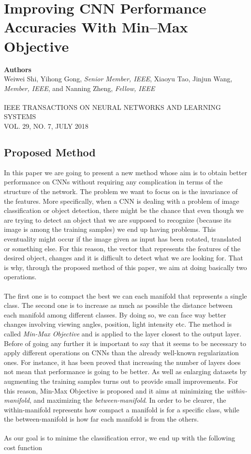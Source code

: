 \chapter{Improving CNN Performance Accuracies With Min–Max Objective}

{\small \textbf{Authors}\\
Weiwei Shi, Yihong Gong, \textit{Senior Member, IEEE}, Xiaoyu Tao, Jinjun Wang, \textit{Member, IEEE},
and Nanning Zheng, \textit{Fellow, IEEE}\\ \\
IEEE TRANSACTIONS ON NEURAL NETWORKS AND LEARNING SYSTEMS\\VOL. 29, NO. 7, JULY 2018}

\section{Proposed Method}

In this paper we are going to present a new method whose aim is to obtain better performance on CNNs without requiring any complication in terms of the structure of the network. The problem we want to focus on is the invariance of the features. More specifically, when a CNN is dealing with a problem of image classification or object detection, there might be the chance that even though we are trying to detect an object that we are supposed to recognize (because its image is among the training samples) we end up having problems. This eventuality might occur if the image given as input has been rotated, translated or something else. For this reason, the vector that represents the features of the desired object, changes and it is difficult to detect what we are looking for. That is why, through the proposed method of this paper, we aim at doing basically two operations.\\ \\
The first one is to compact the best we can each manifold that represents a single class. The second one is to increase as much as possible the distance between each manifold among different classes. By doing so, we can face way better changes involving viewing angles, position, light intensity etc. The method is called \textit{Min-Max Objective} and is applied to the layer closest to the output layer. Before of going any further it is important to say that it seems to be necessary to apply different operations on CNNs than the already well-known regularization ones. For instance, it has been proved that increasing the number of layers does not mean that performance is going to be better. As well as enlarging datasets by augmenting the training samples turns out to provide small improvements. For this reason, Min-Max Objective is proposed and it aims at minimizing the \textit{within-manifold}, and maximizing the \textit{between-manifold}. In order to be clearer, the within-manifold represents how compact a manifold is for a specific class, while the between-manifold is how far each manifold is from the others.\\ \\
As our goal is to minime the classification error, we end up with the following cost function

